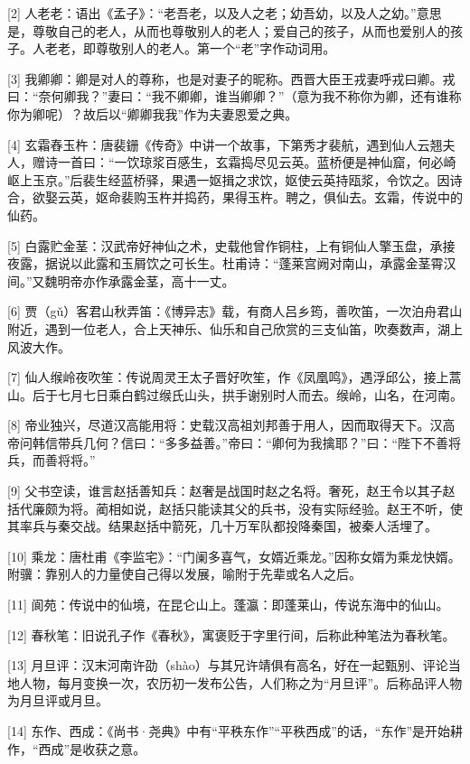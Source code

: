 \documentclass[12pt,UTF8]{ctexbook}
\begin{document}
[2] 人老老：语出《孟子》：“老吾老，以及人之老；幼吾幼，以及人之幼。”意思是，尊敬自己的老人，从而也尊敬别人的老人；爱自己的孩子，从而也爱别人的孩子。人老老，即尊敬别人的老人。第一个“老”字作动词用。

[3] 我卿卿：卿是对人的尊称，也是对妻子的昵称。西晋大臣王戎妻呼戎曰卿。戎曰：“奈何卿我？”妻曰：“我不卿卿，谁当卿卿？”（意为我不称你为卿，还有谁称你为卿呢）？故后以“卿卿我我”作为夫妻恩爱之典。

[4] 玄霜舂玉杵：唐裴銏《传奇》中讲一个故事，下第秀才裴航，遇到仙人云翘夫人，赠诗一首曰：“一饮琼浆百感生，玄霜捣尽见云英。蓝桥便是神仙窟，何必崎岖上玉京。”后裴生经蓝桥驿，果遇一妪揖之求饮，妪使云英持瓯浆，令饮之。因诗合，欲娶云英，妪命裴购玉杵并捣药，果得玉杵。聘之，俱仙去。玄霜，传说中的仙药。

[5] 白露贮金茎：汉武帝好神仙之术，史载他曾作铜柱，上有铜仙人擎玉盘，承接夜露，据说以此露和玉屑饮之可长生。杜甫诗：“蓬莱宫阙对南山，承露金茎霄汉间。”又魏明帝亦作承露金茎，高十一丈。

[6] 贾（gǔ）客君山秋弄笛：《博异志》载，有商人吕乡筠，善吹笛，一次泊舟君山附近，遇到一位老人，合上天神乐、仙乐和自己欣赏的三支仙笛，吹奏数声，湖上风波大作。

[7] 仙人缑岭夜吹笙：传说周灵王太子晋好吹笙，作《凤凰鸣》，遇浮邱公，接上蒿山。后于七月七日乘白鹤过缑氏山头，拱手谢别时人而去。缑岭，山名，在河南。

[8] 帝业独兴，尽道汉高能用将：史载汉高祖刘邦善于用人，因而取得天下。汉高帝问韩信带兵几何？信曰：“多多益善。”帝曰：“卿何为我擒耶？”曰：“陛下不善将兵，而善将将。”

[9] 父书空读，谁言赵括善知兵：赵奢是战国时赵之名将。奢死，赵王令以其子赵括代廉颇为将。蔺相如说，赵括只能读其父的兵书，没有实际经验。赵王不听，使其率兵与秦交战。结果赵括中箭死，几十万军队都投降秦国，被秦人活埋了。

[10] 乘龙：唐杜甫《李监宅》：“门阑多喜气，女婿近乘龙。”因称女婿为乘龙快婿。附骥：靠别人的力量使自己得以发展，喻附于先辈或名人之后。

[11] 阆苑：传说中的仙境，在昆仑山上。蓬瀛：即蓬莱山，传说东海中的仙山。

[12] 春秋笔：旧说孔子作《春秋》，寓褒贬于字里行间，后称此种笔法为春秋笔。

[13] 月旦评：汉末河南许劭（shào）与其兄许靖俱有高名，好在一起甄别、评论当地人物，每月变换一次，农历初一发布公告，人们称之为“月旦评”。后称品评人物为月旦评或月旦。

[14] 东作、西成：《尚书·尧典》中有“平秩东作”“平秩西成”的话，“东作”是开始耕作，“西成”是收获之意。
\end{document}
